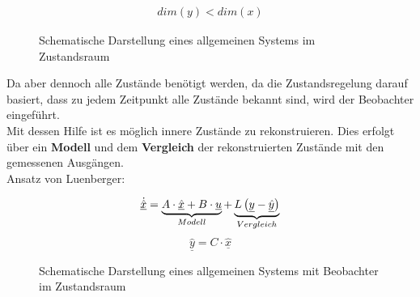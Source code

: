 \documentclass[
	pagesize,
	fontsize=12pt,
	paper=a4,
	oneside,
   reqno
]{scrartcl}
\begin{document}
\begin{align*}
    dim(y) < dim(x)
\end{align*}

\begin{figure}[H]
    \centering
    \caption[Allgemeines System im Zustandsraum]{Schematische Darstellung eines allgemeinen Systems im Zustandsraum}
    \label{fig:Bild33}
\end{figure}

Da aber dennoch alle Zustände benötigt werden, da die Zustandsregelung darauf basiert, dass zu jedem Zeitpunkt alle Zustände bekannt sind, wird der Beobachter eingeführt.\\
Mit dessen Hilfe ist es möglich innere Zustände zu rekonstruieren. Dies erfolgt über ein \textbf{Modell} und dem \textbf{Vergleich} der rekonstruierten Zustände mit den gemessenen Ausgängen.\\
\newline
Ansatz von Luenberger:


\[
    \underline{\dot{\hat{x}}} = 
    \underbrace{%
        A \cdot \underline{\hat{x}} + B \cdot \underline{u}
    }_{%
    Modell
    }
    + 
    \underbrace{%
    L \left( \underline{y} - \underline{\hat{y}}\right)
    }_{%
    Vergleich
    }
\]
\[
    \underline{\hat{y}} = C \cdot \underline{\hat{x}}
\]

\begin{figure}[H]
    \centering
    \caption[System mit Beobachter]{Schematische Darstellung eines allgemeinen Systems mit Beobachter im Zustandsraum}
    \label{fig:Bild34}
\end{figure}
\end{document}
